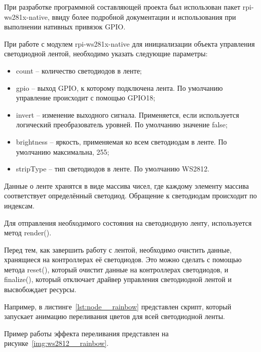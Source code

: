 При разработке программной составляющей проекта был использован пакет rpi-ws281x-native, ввиду более подробной документации и использования при выполнении нативных привязок GPIO.

При работе с модулем rpi-ws281x-native для инициализации объекта управления светодиодной лентой, необходимо указать следующие параметры:

\begin{itemize}
  \item count -- количество светодиодов в ленте;
  \item gpio -- выход GPIO, к которому подключена лента. По умолчанию управление происходит с помощью GPIO18;
  \item invert -- изменение выходного сигнала. Применяется, если используется логический преобразователь уровней. По умолчанию значение false;
  \item brightness -- яркость, применяемая ко всем светодиодам в ленте. По умолчанию максимальна, 255;
  \item stripType -- тип светодиодов в ленте. По умолчанию WS2812.
\end{itemize}

Данные о ленте хранятся в виде массива чисел, где каждому элементу массива соответствует определённый светодиод. Обращение к светодиодам происходит по индексам.

Для отправления необходимого состояния на светодиодную ленту, используется метод render().

Перед тем, как завершить работу с лентой, необходимо очистить данные, хранящиеся на контроллерах её светодиодов. Это можно сделать с помощью метода reset(), который очистит данные на контроллерах светодиодов, и finalize(), который отключает драйвер управления светодиодной лентой и высвобождает ресурсы.

Например, в листинге~\ref{lst:node__rainbow} представлен скрипт, который запускает анимацию переливания цветов для всей светодиодной ленты.



Пример работы эффекта переливания представлен на рисунке~\ref{img:ws2812__rainbow}.

